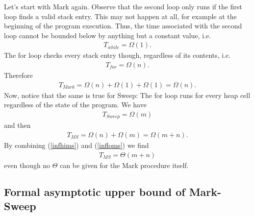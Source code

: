 \documentclass{article}
\begin{document}
Let's start with Mark again. Observe that the second loop only runs if
the first loop finds a valid stack entry. This may not happen at all, for
example at the beginning of the program execution. Thus, the time associated
with the second loop cannot be bounded below by anything but a constant value,
i.e.
\begin{align*}
    T_{while} = \Omega(1).
\end{align*}
The for loop checks every stack entry though, regardless of its contents, i.e.
\begin{align*}
    T_{for} = \Omega(n).
\end{align*}
Therefore
\begin{align*}
    T_{Mark} = \Omega(n) + \Omega(1) + \Omega(1) = \Omega(n).
\end{align*}
Now, notice that the same is true for Sweep: The for loop runs for every
heap cell regardless of the state of the program. We have
\begin{align*}
    T_{Sweep} = \Omega(m)
\end{align*}
and then
\begin{align}
    \label{infloms}
    T_{MS} = \Omega(n) + \Omega(m) = \Omega(m+n).
\end{align}
By combining (\ref{infhims}) and (\ref{infloms}) we find
\begin{align*}
    T_{MS} = \Theta(m+n)
\end{align*}
even though no $\Theta$ can be given for the Mark procedure itself.

\subsection{Formal asymptotic upper bound of Mark-Sweep}
\end{document}
